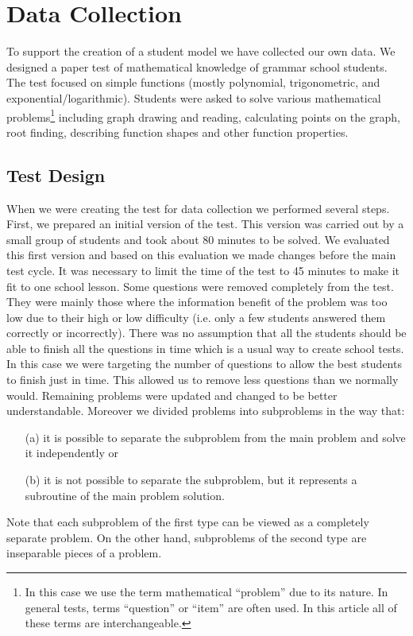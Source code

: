 \chapter{Data Collection}
 
To support the creation of a student model we have collected our own data. We designed a paper test of mathematical knowledge of grammar school students. The test focused on simple functions (mostly polynomial, trigonometric, and exponential/logarithmic). Students were asked to solve various mathematical problems\footnote{In this case we use the term mathematical ``problem'' due to its nature. In general tests,	 terms ``question'' or ``item'' are often used. In this article all of these terms are interchangeable.} including graph drawing and reading, calculating points on the graph, root finding, describing function shapes and other function properties. 

\section{Test Design}
When we were creating the test for data collection we performed several steps. First, we prepared an initial version of the test. This version was carried out by a small group of students and took about 80 minutes to be solved. We evaluated this first version and based on this evaluation we made changes before the main test cycle. It was necessary to limit the time of the test to 45 minutes to make it fit to one school lesson. Some questions were removed completely from the test. They were mainly those where the information benefit of the problem was too low due to their high or low difficulty (i.e. only a few students answered them correctly or incorrectly). There was no assumption that all the students should be able to finish all the questions in time which is a usual way to create school tests. In this case we were targeting the number of questions to allow the best students to finish just in time. This allowed us to remove less questions than we normally would. Remaining problems were updated and changed to be better understandable.  Moreover we divided problems into subproblems in the way that: 
\begin{itemize}
\item[(a)] it is possible to separate the subproblem from the main problem and solve it independently or 
\item[(b)] it is not possible to separate the subproblem, but it represents a subroutine of the main problem solution. 
\end{itemize}
Note that each subproblem of the first type can be viewed as a completely separate problem. 
On the other hand, subproblems of the second type are inseparable pieces of a problem.\\

